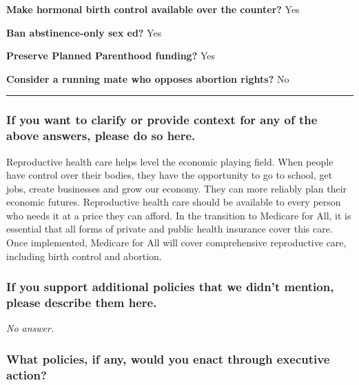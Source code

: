 \textbf{Make hormonal birth control available over the counter?} Yes

\textbf{Ban abstinence-only sex ed?} Yes

\textbf{Preserve Planned Parenthood funding?} Yes

\textbf{Consider a running mate who opposes abortion rights?} No

\begin{center}\rule{0.5\linewidth}{\linethickness}\end{center}

\hypertarget{if-you-want-to-clarify-or-provide-context-for-any-of-the-above-answers-please-do-so-here-7}{%
\subsubsection{If you want to clarify or provide context for any of the
above answers, please do so
here.}\label{if-you-want-to-clarify-or-provide-context-for-any-of-the-above-answers-please-do-so-here-7}}

Reproductive health care helps level the economic playing field. When
people have control over their bodies, they have the opportunity to go
to school, get jobs, create businesses and grow our economy. They can
more reliably plan their economic futures. Reproductive health care
should be available to every person who needs it at a price they can
afford. In the transition to Medicare for All, it is essential that all
forms of private and public health insurance cover this care. Once
implemented, Medicare for All will cover comprehensive reproductive
care, including birth control and abortion.

\hypertarget{if-you-support-additional-policies-that-we-didnt-mention-please-describe-them-here-7}{%
\subsubsection{If you support additional policies that we didn't
mention, please describe them
here.}\label{if-you-support-additional-policies-that-we-didnt-mention-please-describe-them-here-7}}

\emph{No answer.}

\hypertarget{what-policies-if-any-would-you-enact-through-executive-action-7}{%
\subsubsection{What policies, if any, would you enact through executive
action?}\label{what-policies-if-any-would-you-enact-through-executive-action-7}}

